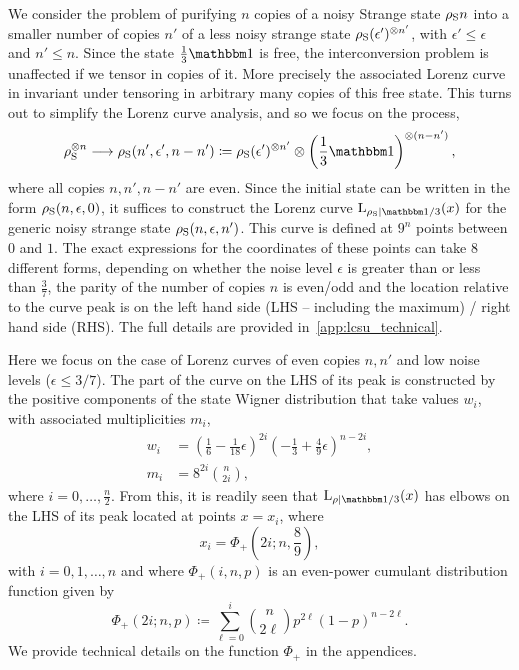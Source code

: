 \documentclass[pra,
aps,
twocolumn,
superscriptaddress,
groupedaddress,
nofootinbib,
reprint
]{revtex4-1}
\begin{document}
We consider the problem of purifying $n$ copies of a noisy Strange state $\rho_{\rm{S}}n$ into a smaller number of copies $n'$ of a less noisy strange state $\rho_{\rm{S}}(\epsilon')^{\otimes n'}$, with $\epsilon' \le \epsilon$ and $n' \leq n$. 
Since the state $\frac{1}{3} \id$ is free, the interconversion problem is unaffected if we tensor in copies of it. More precisely the associated Lorenz curve in invariant under tensoring in arbitrary many copies of this free state.
This turns out to simplify the Lorenz curve analysis, and so we focus on the process,
\begin{equation}\label{eq:sudist}
	\rho_{\rm{S}}^{\otimes n} \longrightarrow \rho_{\rm{S}}(n', \epsilon', n - n') \coloneqq  \rho_{\rm{S}}(\epsilon')^{\otimes n'} \otimes \left( \frac{1}{3}\id \right)^{\otimes (n-n')},
\end{equation}
where all copies $n, n', n - n'$ are even.
Since the initial state can be written in the form $\rho_{\rm{S}}(n, \epsilon, 0)$, it suffices to construct the Lorenz curve $\lc{\rho_{\rm{S}}}{\id/3}(x)$ for the generic noisy strange state $\rho_{\rm{S}}(n, \epsilon ,n')$.
This curve is defined at $9^n$ points between $0$ and $1$.
The exact expressions for the coordinates of these points can take $8$ different forms, depending on whether the noise level $\epsilon$ is greater than or less than $\frac{3}{7}$, the parity of the number of copies $n$ is even/odd and the location relative to the curve peak is on the left hand side (LHS -- including the maximum) / right hand side (RHS).
The full details are provided in~\cref{app:lcsu_technical}.

Here we focus on the case of Lorenz curves of even copies $n, n'$ and low noise levels ($\epsilon \leq 3/7$).
The part of the curve on the LHS of its peak is constructed by the positive components of the state Wigner distribution that take values $w_i$, with associated multiplicities $m_i$,
\begin{align}
	w_i &= \left( \frac{1}{6} - \frac{1}{18}\epsilon \right)^{2i}\left( -\frac{1}{3} + \frac{4}{9}\epsilon \right)^{n-2i}, \\
	m_i &= 8^{2i}\binom{n}{2i},
\end{align}
where $i=0,\dots,\frac{n}{2}$.
From this, it is readily seen that $\lc{\rho}{\id/3}(x)$ has elbows on the LHS of its peak located at points $x=x_i$, where
\begin{equation}
	x_i = \Phi_+ \left( 2i; n , \frac{8}{9} \right),
\end{equation}
with $i = 0,1, \dots , n$ and where $\Phi_+(i,n,p)$ is an even-power cumulant distribution function given by
\begin{equation}
	\Phi_+(2i; n, p) \coloneqq \sum_{\ell=0}^{i} \binom{n}{2\ell} p ^{2\ell} (1-p)^{n-2\ell}.
\end{equation}
We provide technical details on the function $\Phi_+$ in the appendices.
\end{document}
